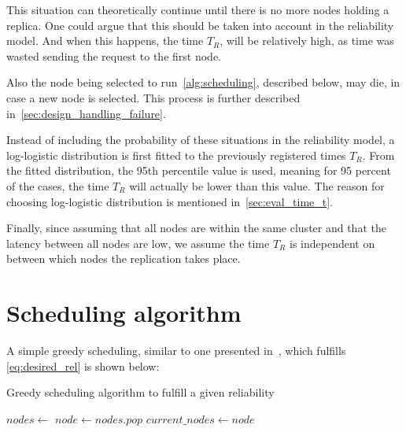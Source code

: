 \documentclass{cslthse-msc}
\begin{document}
This situation can theoretically continue until there is no more nodes holding a replica. One could argue that this should be taken into account in the reliability model. And when this happens, the time $T_R$, will be relatively high, as time was wasted sending the request to the first node. 

Also the node being selected to run~\cref{alg:scheduling}, described below, may die, in case a new node is selected. This process is further described in~\cref{sec:design_handling_failure}.

Instead of including the probability of these situations in the reliability model, a log-logistic distribution is first fitted to the previously registered times $T_R$. From the fitted distribution, the 95th percentile value is used, meaning for 95 percent of the cases, the time $T_R$ will actually be lower than this value. The reason for choosing log-logistic distribution is mentioned in~\cref{sec:eval_time_t}.

Finally, since assuming that all nodes are within the same cluster and that the latency between all nodes are low, we assume the time $T_R$ is independent on between which nodes the replication takes place. 


\section{Scheduling algorithm} \label{sec:design_sched_alg}
A simple greedy scheduling, similar to one presented in~\cite{effTaskReplMobGrid}, which fulfills \cref{eq:desired_rel} is shown below:


\begin{algorithm}[H]
	\caption{Greedy scheduling algorithm to fulfill a given reliability} \label{alg:scheduling}
	\begin{algorithmic}[1]
	\Statex
	\State $nodes\gets $ 
		\State $node\gets nodes.pop$
		\State
		\State $current\_nodes\gets node$
	\EndWhile
	\EndProcedure
	\end{algorithmic}
\end{algorithm} 
\end{document}
